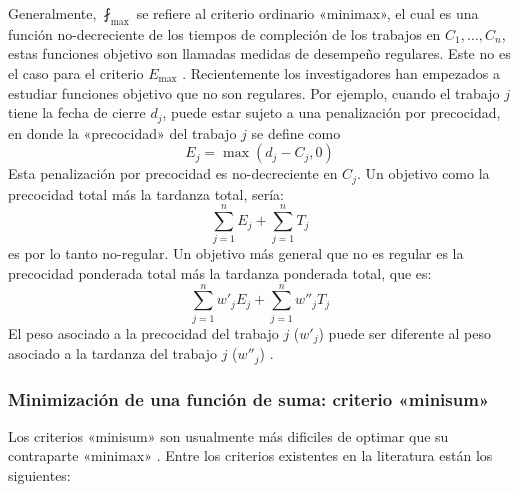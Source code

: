 \documentclass[spanish,draft,12pt,headsepline,footsepline,paper=letter]{scrreprt}
\begin{document}
Generalmente, $\fint_{\max}$ se refiere al criterio ordinario «minimax», el cual es una función no\nobreakdash-decreciente de los tiempos de compleción de los trabajos en $C_1,\dots,C_n$, estas funciones objetivo son llamadas medidas de desempeño regulares. Este no es el caso para el criterio $E_{\max}$ \citep[p.~13]{TKindt2002}. Recientemente los investigadores han empezados a estudiar funciones objetivo que no son regulares. Por ejemplo, cuando el trabajo $j$ tiene la fecha de cierre $d_j$, puede estar sujeto a una penalización por precocidad, en donde la «precocidad» del trabajo $j$ se define como 
\[ E_j = \max (d_j - C_j, 0) \]
Esta penalización por precocidad es no\nobreakdash-decreciente en $C_j$. Un objetivo como la precocidad total más la tardanza total, sería:
\[ \sum_{j=1}^{n}E_{j}+\sum_{j=1}^{n}T_{j} \]
es por lo tanto no\nobreakdash-regular. Un objetivo más general que no es regular es la precocidad ponderada total más la tardanza ponderada total, que es:
\[ \sum_{j=1}^{n}w'_jE_{j}+\sum_{j=1}^{n}w''_jT_{j} \]
El peso asociado a la precocidad del trabajo $j$ ($w'_j$) puede ser diferente al peso asociado a la tardanza del trabajo $j$ ($w''_j$) \citep[p.~19]{Pinedo1995}.

\subsubsection[Criterio «minisum»]{Minimización de una función de suma: criterio «minisum»}

Los criterios «minisum» son usualmente más dificiles de optimar que su contraparte «minimax» \citep[p.~13]{TKindt2002}. Entre los criterios existentes en la literatura están los siguientes:
\end{document}
